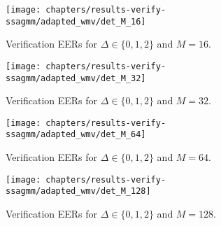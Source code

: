 \newpage


\begin{figure}[ht]
	\centering
	\texttt{[image: chapters/results-verify-ssagmm/adapted\_wmv/det\_M\_16]}
	\caption{Verification EERs for $\Delta \in \{0, 1, 2\}$ and $M = 16$.}
	\label{fig:results-verify-ssagmm_M_16}
\end{figure}

\newpage


\begin{figure}[ht]
	\centering
	\texttt{[image: chapters/results-verify-ssagmm/adapted\_wmv/det\_M\_32]}
	\caption{Verification EERs for $\Delta \in \{0, 1, 2\}$ and $M = 32$.}
	\label{fig:results-verify-ssagmm_M_32}
\end{figure}

\newpage


\begin{figure}[ht]
	\centering
	\texttt{[image: chapters/results-verify-ssagmm/adapted\_wmv/det\_M\_64]}
	\caption{Verification EERs for $\Delta \in \{0, 1, 2\}$ and $M = 64$.}
	\label{fig:results-verify-ssagmm_M_64}
\end{figure}

\newpage


\begin{figure}[ht]
	\centering
	\texttt{[image: chapters/results-verify-ssagmm/adapted\_wmv/det\_M\_128]}
	\caption{Verification EERs for $\Delta \in \{0, 1, 2\}$ and $M = 128$.}
	\label{fig:results-verify-ssagmm_M_128}
\end{figure}
